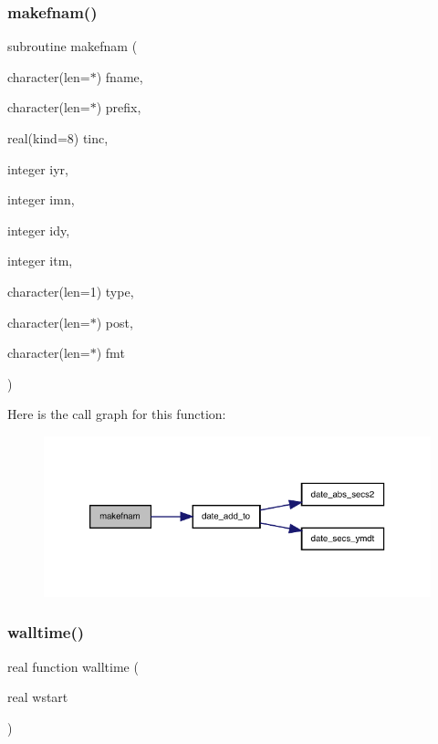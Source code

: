 \subsubsection{\texorpdfstring{makefnam()}{makefnam()}}
{\footnotesize\ttfamily subroutine makefnam (\begin{DoxyParamCaption}\item[{character(len=$\ast$)}]{fname,  }\item[{character(len=$\ast$)}]{prefix,  }\item[{real(kind=8)}]{tinc,  }\item[{integer}]{iyr,  }\item[{integer}]{imn,  }\item[{integer}]{idy,  }\item[{integer}]{itm,  }\item[{character(len=1)}]{type,  }\item[{character(len=$\ast$)}]{post,  }\item[{character(len=$\ast$)}]{fmt }\end{DoxyParamCaption})}

Here is the call graph for this function\+:
\nopagebreak
\begin{figure}[H]
\begin{center}
\leavevmode
\includegraphics[width=333pt]{utils__f_8f90_a8918adb41c1a9ae40d85373da53742db_cgraph}
\end{center}
\end{figure}
\mbox{\label{utils__f_8f90_ad3ffdbdf7c50b9d7de84489e2e30eec5}} 
\subsubsection{\texorpdfstring{walltime()}{walltime()}}
{\footnotesize\ttfamily real function walltime (\begin{DoxyParamCaption}\item[{real}]{wstart }\end{DoxyParamCaption})}

